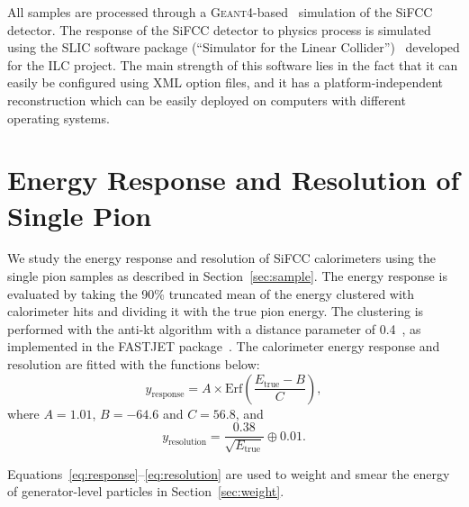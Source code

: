 \documentclass{PoS}
\newcommand{\GEANTfour} {{\textsc{Geant4}}}
\begin{document}
All samples are processed through a \GEANTfour-based~\cite{GEANT4} simulation 
of the SiFCC detector. The response of the SiFCC detector to physics process 
is simulated using the SLIC software package (``Simulator for the Linear 
Collider'')~\cite{SLIC} developed for the ILC project. The main strength of 
this software lies in the fact that it can easily be configured using XML 
option files, and it has a platform-independent reconstruction which can be 
easily deployed on computers with different operating systems. 


\section{Energy Response and Resolution of Single Pion}
We study the energy response and resolution of SiFCC calorimeters using the 
single pion samples as described in Section~\ref{sec:sample}. The energy 
response is evaluated by taking the 90\% truncated mean of the energy 
clustered with calorimeter hits and dividing it with the true pion energy. 
The clustering is performed with the anti-kt algorithm with a distance 
parameter of 0.4~\cite{Cacciari:2008gp}, as implemented in the \textsc{FASTJET}
package~\cite{fastjet}. The calorimeter energy response and resolution are 
fitted with the functions below:
\begin{equation}
 y_\mathrm{response} = A \times \mathrm{Erf}\left(\frac{E_\mathrm{true}-B}{C}\right),
\label{eq:response}
\end{equation}
where $A=1.01$, $B=-64.6$ and $C=56.8$, and 
\begin{equation}
 y_\mathrm{resolution} = \frac{0.38}{\sqrt{E_\mathrm{true}}} \oplus 0.01.
\label{eq:resolution}
\end{equation}

Equations~\ref{eq:response}--\ref{eq:resolution} are used to weight and 
smear the energy of generator-level particles in Section~\ref{sec:weight}.
\end{document}
